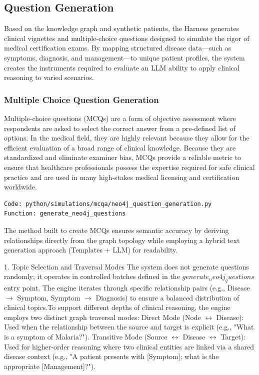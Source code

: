 
\subsection{Question Generation}
Based on the knowledge graph and synthetic patients, the Harness generates clinical vignettes and multiple-choice questions designed to simulate the rigor of medical certification exams. By mapping structured disease data—such as symptoms, diagnosis, and management—to unique patient profiles, the system creates the instruments required to evaluate an LLM ability to apply clinical reasoning to varied scenarios.

\subsubsection{Multiple Choice Question Generation}
Multiple-choice questions (MCQs) are a form of objective assessment where respondents are asked to select the correct answer from a pre-defined list of options. In the medical field, they are highly relevant because they allow for the efficient evaluation of a broad range of clinical knowledge. Because they are standardized and eliminate examiner bias, MCQs provide a reliable metric to ensure that healthcare professionals possess the expertise required for safe clinical practice and are used in many high-stakes medical licensing and certification worldwide.

\begin{verbatim}
Code: python/simulations/mcqa/neo4j_question_generation.py
Function: generate_neo4j_questions
\end{verbatim}

The method built to create MCQs ensures semantic accuracy by deriving relationships directly from the graph topology while employing a hybrid text generation approach (Templates + LLM) for readability.

1. Topic Selection and Traversal Modes
The system does not generate questions randomly; it operates in controlled batches defined in the $generate_neo4j_questions$ entry point. The engine iterates through specific relationship pairs (e.g., Disease $\rightarrow$ Symptom, Symptom $\rightarrow$ Diagnosis) to ensure a balanced distribution of clinical topics.To support different depths of clinical reasoning, the engine employs two distinct graph traversal modes:
Direct Mode (Node $\leftrightarrow$ Disease): Used when the relationship between the source and target is explicit (e.g., "What is a symptom of Malaria?").
Transitive Mode (Source $\leftrightarrow$ Disease $\leftrightarrow$ Target): Used for higher-order reasoning where two clinical entities are linked via a shared disease context (e.g., "A patient presents with [Symptom]; what is the appropriate [Management]?").

